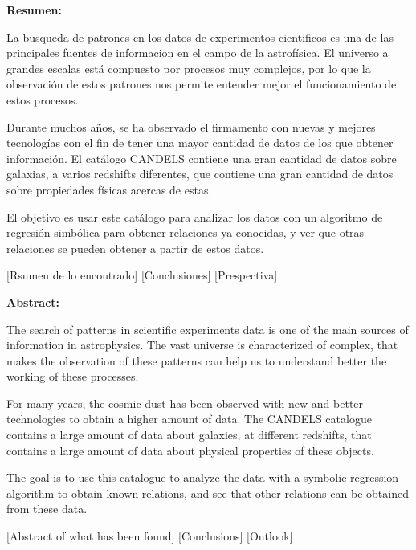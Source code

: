 \documentclass[11pt, a4paper]{article} %
\begin{document}

{\bfseries \large Resumen:} \vspace{5mm}

La busqueda de patrones en los datos de experimentos cientificos es una de las principales
fuentes de informacion en el campo de la astrofísica. El universo a grandes escalas está 
compuesto por procesos muy complejos, por lo que la
observación de estos patrones nos permite entender mejor el funcionamiento de estos procesos.

Durante muchos años, se ha observado el firmamento con nuevas y mejores tecnologías con el 
fin de tener una mayor cantidad de datos de los que obtener información. El catálogo CANDELS
contiene una gran cantidad de datos sobre galaxias,  a varios redshifts diferentes, que 
contiene una gran cantidad de datos sobre propiedades físicas acercas de estas. 

El objetivo es usar este catálogo para analizar los datos con un algoritmo de regresión simbólica 
para obtener relaciones ya conocidas, y ver que otras relaciones se pueden obtener a partir de 
estos datos.

[Rsumen de lo encontrado]
[Conclusiones]
[Prespectiva]
\vspace{10mm}

{\bfseries \large Abstract: } \vspace{5mm} 

The search of patterns in scientific experiments data is one of the main sources of 
information in astrophysics. The vast universe is characterized of complex, that makes the
observation of these patterns can help us to understand better the working of these processes.

For many years, the cosmic dust has been observed with new and better technologies to obtain a 
higher amount of data. The CANDELS catalogue contains a large amount of data about galaxies, 
at different redshifts, that contains a large amount of data about physical properties of these objects.

The goal is to use this catalogue to analyze the data with a symbolic regression algorithm to obtain 
known relations, and see that other relations can be obtained from these data.

[Abstract of what has been found]
[Conclusions]
[Outlook]

\vspace{1cm}
\end{document}
